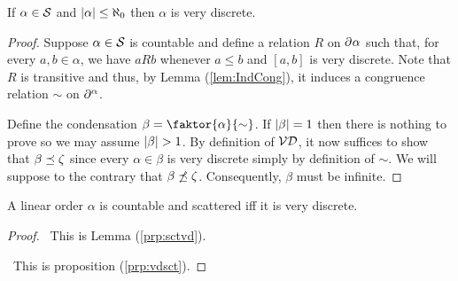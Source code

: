     \begin{lem}\label{prp:sctvd}
        If $\alpha\in\mathcal{S}$ and $\left\lvert\alpha\right\rvert\leq\aleph_0$ then $\alpha$ is very discrete.
    \end{lem}

\begin{proof}
    Suppose $\alpha\in\mathcal{S}$ is countable and define a relation $R$ on $\partial^{}\alpha$ such that, for every $a,b\in\alpha$, we have $aRb$ whenever $a\leq b$ and $[a,b]$ is very discrete.  Note that $R$ is transitive and thus, by Lemma (\ref{lem:IndCong}), it induces a congruence relation $\sim$ on $\partial^{\alpha}$.

        Define the condensation $\beta=\faktor{\alpha}{\sim}$.  If $\left\lvert\beta\right\rvert=1$ then there is nothing to prove so we may assume $\left\lvert\beta\right\rvert>1$.  By definition of $\mathcal{VD}$, it now suffices to show that $\beta\preceq\zeta$ since every $\alpha\in\beta$ is very discrete simply by definition of $\sim$.  We will suppose to the contrary that $\beta\not\preceq\zeta$.  Consequently, $\beta$ must be infinite.
\end{proof}

    	\iffalse\begin{prp}\label{prp:splitfix}
		Suppose $\Lambda$ is the lattice of condensations of the linear order $\alpha$.  Define $S$ to be the functor that takes each factor map $f\colon\alpha\to\beta$ to the splitting $S(f)\colon\alpha\to\faktor{\alpha}{\sim_\beta}$, for some congruence $\sim_\beta$ on $\alpha$, such that the unique isomorphism $\iota_\beta\colon\faktor{\alpha}{\sim_\beta}\to\beta$ makes the diagram
		\begin{equation}
			\begin{tikzcd}
				\alpha\arrow[rr,"S(f)"]&&\faktor{\alpha}{\sim_\beta}\arrow[dd,"\iota_\beta",dashrightarrow]\\
				\\
						       &&\beta\arrow[from=lluu,"f"]
			\end{tikzcd}
		\end{equation}
		commute.  If $\beta\in\Lambda$ is a minimal fixed point of $S^\prime=S\fsplit[-]$, and $\beta$ is not trivially dense then $\beta\in\Dense$.
		\begin{enumerate}
			.
		\end{enumerate}
	\end{prp}\fi

\begin{thm}
	A linear order $\alpha$ is countable and  scattered iff it is very discrete.
\end{thm}
\begin{proof}

	\forward\	This is Lemma (\ref{prp:sctvd}).

	\backward\	This is proposition (\ref{prp:vdsct}).
\end{proof}


